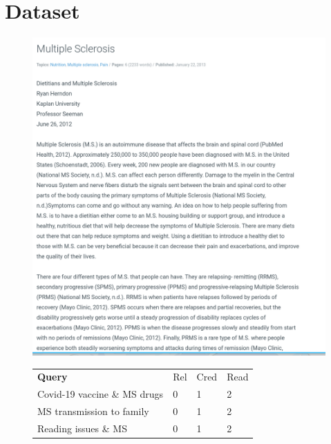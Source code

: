 \newpage
\appendix
\chapter{Dataset}\label{appendix:dataset}
\newpage
\begin{figure}
    \begin{minipage}{\textwidth}
        \centering
        \includegraphics[width=\linewidth]{images/sample_query_multi_eval.png}
    \end{minipage}
    \begin{minipage}{\textwidth}
        \centering
        \begin{tabularx}{\linewidth}{lXXX}
        \textbf{Query}                                                         & Rel & Cred & Read \\
        Covid-19 vaccine \& MS drugs                                            & 0            & 1             & 2             \\
        MS transmission to family                                              & 0            & 1             & 2             \\
        Reading issues \& MS                                                    & 0            & 1             & 2             \\

\end{tabularx}
\end{minipage}
\end{figure}
